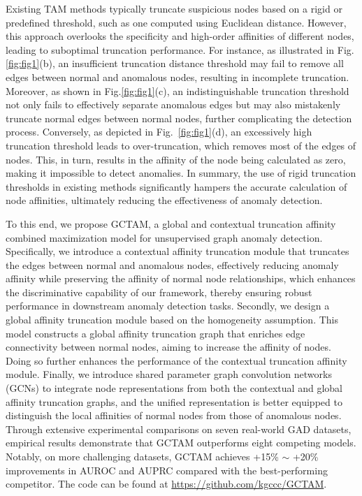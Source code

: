 \documentclass{article}
\begin{document}
Existing TAM methods typically truncate suspicious nodes based on a rigid or predefined threshold, such as one computed using Euclidean distance. However, this approach overlooks the specificity and high-order affinities of different nodes, leading to suboptimal truncation performance. For instance, as illustrated in Fig.\ref{fig:fig1}(b), an insufficient truncation distance threshold may fail to remove all edges between normal and anomalous nodes, resulting in incomplete truncation. Moreover, as shown in Fig.\ref{fig:fig1}(c), an indistinguishable truncation threshold not only fails to effectively separate anomalous edges but may also mistakenly truncate normal edges between normal nodes, further complicating the detection process. Conversely, as depicted in Fig.~\ref{fig:fig1}(d), an excessively high truncation threshold leads to over-truncation, which removes most of the edges of nodes. This, in turn, results in the affinity of the node being calculated as zero, making it impossible to detect anomalies. In summary, the use of rigid truncation thresholds in existing methods significantly hampers the accurate calculation of node affinities, ultimately reducing the effectiveness of anomaly detection.

To this end, we propose GCTAM, a global and contextual truncation affinity combined maximization model for unsupervised graph anomaly detection. Specifically, we introduce a contextual affinity truncation module that truncates the edges between normal and anomalous nodes, effectively reducing anomaly affinity while preserving the affinity of normal node relationships, which enhances the discriminative capability of our framework, thereby ensuring robust performance in downstream anomaly detection tasks.  Secondly, we design a global affinity truncation module based on the homogeneity assumption. This model constructs a global affinity truncation graph that enriches edge connectivity between normal nodes, aiming to increase the affinity of nodes. Doing so further enhances the performance of the contextual truncation affinity module. Finally, we introduce shared parameter graph convolution networks (GCNs) to integrate node representations from both the contextual and global affinity truncation graphs, and the unified representation is better equipped to distinguish the local affinities of normal nodes from those of anomalous nodes.
Through extensive experimental comparisons on seven real-world GAD datasets, empirical results demonstrate that GCTAM outperforms eight competing models. Notably, on more challenging datasets, GCTAM achieves +15\% $\sim$ +20\% improvements in AUROC and AUPRC compared with the best-performing competitor. The code can be found at \url{https://github.com/kgccc/GCTAM}.
\end{document}

